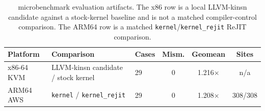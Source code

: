 \begin{table}[t]
\centering
\scriptsize
\caption{\lang microbenchmark evaluation artifacts. The x86 row is a local LLVM-kinsn candidate against a stock-kernel baseline and is not a matched compiler-control comparison. The ARM64 row is a matched \texttt{kernel}/\texttt{kernel\_rejit} ReJIT comparison.}
\label{tab:eval-kinsn-micro}
\begin{tabular}{@{}lllccc@{}}
\toprule
Platform & Comparison & Cases & Mism. & Geomean & Sites \\
\midrule
x86-64 KVM & LLVM-kinsn candidate / stock kernel & 29 & 0 & 1.216$\times$ & n/a \\
ARM64 AWS & \texttt{kernel} / \texttt{kernel\_rejit} & 29 & 0 & 1.208$\times$ & 308/308 \\
\bottomrule
\end{tabular}
\end{table}
